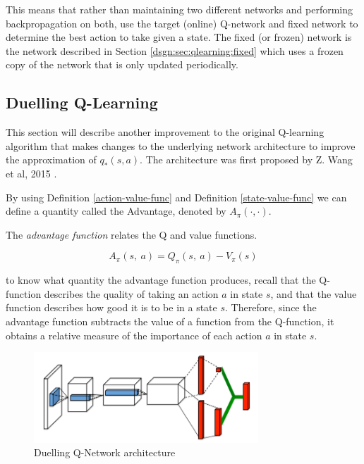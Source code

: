 This means that rather than maintaining two different networks and performing backpropagation on both, use the target (online) Q-network and fixed network to determine the best action to take given a state. The fixed (or frozen) network is the network described in Section \ref{dsgn:sec:qlearning:fixed} which uses a frozen copy of the network that is only updated periodically.

\subsection{Duelling Q-Learning}
\label{dsgn:sec:qlearning:dueldqn}

This section will describe another improvement to the original Q-learning algorithm that makes changes to the underlying network architecture to improve the approximation of $q_*(s, a)$. The architecture was first proposed by Z. Wang et al, 2015 \cite{wang2015dueling}.

By using Definition \ref{action-value-func} and Definition \ref{state-value-func} we can define a quantity called the Advantage, denoted by $A_\pi(\cdot, \cdot)$.

\begin{defn}
	\label{advantage-func}
	The \textit{advantage function} relates the Q and value functions.

	\[
		A_\pi(s,~a) = Q_\pi(s,~a) - V_\pi(s)
	\]
\end{defn}

to know what quantity the advantage function produces, recall that the Q-function describes the quality of taking an action $a$ in state $s$, and that the value function describes how good it is to be in a state $s$. Therefore, since the advantage function subtracts the value of a function from the Q-function, it obtains a relative measure of the importance of each action $a$ in state $s$.

\begin{figure}[htbp]
	\centering
	\includegraphics[width=0.75\textwidth]{chapters/chapter3/images/duelling.png}
	\caption{Duelling Q-Network architecture
		\label{fig:duelling-arch}
	}
\end{figure}

